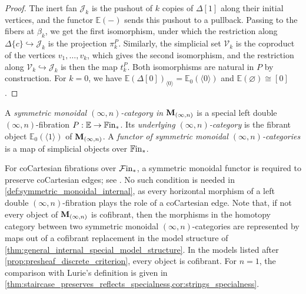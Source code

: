 \documentclass[10pt,reqno]{amsart}
\begin{document}
\begin{proof}
The inert fan $\mathcal J_k$ is the pushout of $k$ copies of
$\Delta[1]$ along their initial vertices, and the functor
$\mathbb E(-)$ sends this pushout to a pullback. Passing to the
fibers at $\beta_k$, we get the first isomorphism, under which the
restriction along $\Delta\{c\}\hookrightarrow\mathcal J_k$ is the
projection $\pi_k^P$. Similarly, the simplicial set $\mathcal V_k$
is the coproduct of the vertices $v_1,\ldots,v_k$, which gives the
second isomorphism, and the restriction along
$\mathcal V_k\hookrightarrow\mathcal J_k$ is then the map $t_k^P$.
Both isomorphisms are natural in $P$ by construction. For $k=0$,
we have
$\mathbb E(\Delta[0])_{\langle0\rangle}=\mathbb E_0(\langle0\rangle)$
and $\mathbb E(\varnothing)\cong[0]$.
\end{proof}

\begin{definition}
\label{def:symmetric_monoidal_internal}
A \emph{symmetric monoidal $(\infty,n)$-category in $\mathbf M_{(\infty,n)}$}
is a special left double $(\infty,n)$-fibration
$P:\mathbb E\to\mathbb{F}\mathrm{in}_*$. Its \emph{underlying
$(\infty,n)$-category} is the fibrant object
$\mathbb E_0(\langle1\rangle)$ of $\mathbf M_{(\infty,n)}$. A \emph{functor of
symmetric monoidal $(\infty,n)$-categories} is a map of simplicial
objects over $\mathbb{F}\mathrm{in}_*$.
\end{definition}

\begin{rmk}
\label{rem:internal_monoidal_functors}
For coCartesian fibrations over $\mathcal{F}\mathrm{in}_*$, a symmetric monoidal
functor is required to preserve coCartesian edges; see
\cite[Definition~2.1.3.7]{LurieHA}. No such condition is needed in
\cref{def:symmetric_monoidal_internal}, as every horizontal morphism
of a left double $(\infty,n)$-fibration plays the role of a
coCartesian edge. Note that, if not every object of $\mathbf M_{(\infty,n)}$ is
cofibrant, then the morphisms in the homotopy category between two
symmetric monoidal $(\infty,n)$-categories are represented by maps
out of a cofibrant replacement in the model structure of
\cref{thm:general_internal_special_model_structure}. In the models
listed after \cref{prop:presheaf_discrete_criterion}, every object is
cofibrant. For $n=1$, the comparison with Lurie's definition is
given in
\cref{thm:staircase_preserves_reflects_specialness,cor:strings_specialness}.
\end{rmk}
\end{document}
